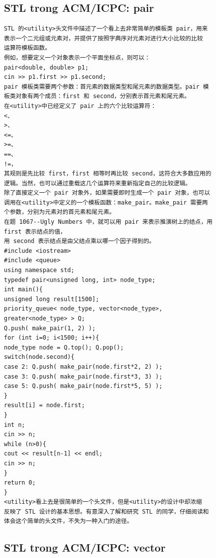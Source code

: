 \documentclass[11pt]{article}
\begin{document}
\subsection{STL trong ACM/ICPC: pair}

\begingroup
\scriptsize
\begin{verbatim}
STL 的<utility>头文件中描述了一个看上去非常简单的模板类 pair，用来
表示一个二元组或元素对，并提供了按照字典序对元素对进行大小比较的比较
运算符模板函数。
例如，想要定义一个对象表示一个平面坐标点，则可以：
pair<double, double> p1;
cin >> p1.first >> p1.second;
pair 模板类需要两个参数：首元素的数据类型和尾元素的数据类型。pair 模
板类对象有两个成员：first 和 second，分别表示首元素和尾元素。
在<utility>中已经定义了 pair 上的六个比较运算符：
<、
>、
<=、
>=、
==、
!=，
其规则是先比较 first，first 相等时再比较 second，这符合大多数应用的
逻辑。当然，也可以通过重载这几个运算符来重新指定自己的比较逻辑。
除了直接定义一个 pair 对象外，如果需要即时生成一个 pair 对象，也可以
调用在<utility>中定义的一个模板函数：make_pair。make_pair 需要两
个参数，分别为元素对的首元素和尾元素。
在题 1067--Ugly Numbers 中，就可以用 pair 来表示推演树上的结点，用
first 表示结点的值，
用 second 表示结点是由父结点乘以哪一个因子得到的。
#include <iostream>
#include <queue>
using namespace std;
typedef pair<unsigned long, int> node_type;
int main(){
unsigned long result[1500];
priority_queue< node_type, vector<node_type>,
greater<node_type> > Q;
Q.push( make_pair(1, 2) );
for (int i=0; i<1500; i++){
node_type node = Q.top(); Q.pop();
switch(node.second){
case 2: Q.push( make_pair(node.first*2, 2) );
case 3: Q.push( make_pair(node.first*3, 3) );
case 5: Q.push( make_pair(node.first*5, 5) );
}
result[i] = node.first;
}
int n;
cin >> n;
while (n>0){
cout << result[n-1] << endl;
cin >> n;
}
return 0;
}
<utility>看上去是很简单的一个头文件，但是<utility>的设计中却浓缩
反映了 STL 设计的基本思想。有意深入了解和研究 STL 的同学，仔细阅读和
体会这个简单的头文件，不失为一种入门的途径。
\end{verbatim}
\endgroup

\subsection{STL trong ACM/ICPC: vector}
\end{document}
